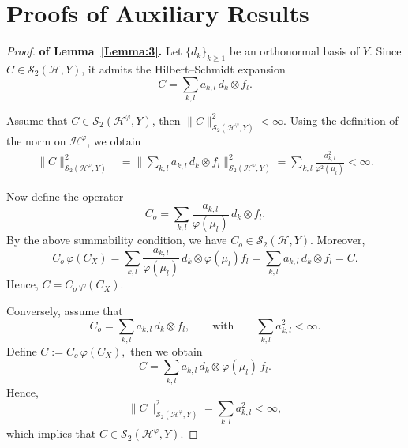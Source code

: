 \documentclass[twoside,11pt]{article}
\begin{document}
\section{Proofs of Auxiliary Results}\label{Auxillary_results}
\begin{proof}\textbf{of Lemma~\ref{Lemma:3}.}
Let $\{d_k\}_{k\ge 1}$ be an orthonormal basis of $Y$.
Since $C \in \mathcal S_2(\mathcal H,Y)$, it admits the Hilbert–Schmidt expansion
\[
C = \sum_{k,l} a_{k,l}\, d_k \otimes f_l .
\]

\noindent 
Assume that $C \in \mathcal S_2(\mathcal H^\varphi,Y)$, then
$
\|C\|_{\mathcal S_2(\mathcal H^\varphi,Y)}^2 < \infty .
$
Using the definition of the norm on $\mathcal H^\varphi$, we obtain
\begin{align*}
\|C\|_{\mathcal S_2(\mathcal H^\varphi,Y)}^2
&= \Big\| \sum_{k,l} a_{k,l}\, d_k \otimes f_l \Big\|_{\mathcal S_2(\mathcal H^\varphi,Y)}^2 = \sum_{k,l} \frac{a_{k,l}^2}{\varphi^2(\mu_l)} < \infty .
\end{align*}

\noindent
Now define the operator
\[
C_o = \sum_{k,l} \frac{a_{k,l}}{\varphi(\mu_l)} \, d_k \otimes f_l .
\]
By the above summability condition, we have $C_o \in \mathcal S_2(\mathcal H,Y)$. Moreover,
\[
C_o \, \varphi(C_X)
= \sum_{k,l} \frac{a_{k,l}}{\varphi(\mu_l)} \, d_k \otimes \varphi(\mu_l) f_l
= \sum_{k,l} a_{k,l}\, d_k \otimes f_l
= C .
\]
Hence,
$
C = C_o \, \varphi(C_X).
$

\bigskip
Conversely, assume that
\[
C_o = \sum_{k,l} a_{k,l}\, d_k \otimes f_l,
\qquad \text{with} \qquad
\sum_{k,l} a_{k,l}^2 < \infty .
\]
Define $
C := C_o \, \varphi(C_X),$ then we obtain
\[
C = \sum_{k,l} a_{k,l}\, d_k \otimes \varphi(\mu_l)\, f_l .
\]
Hence,
\[
\|C\|_{\mathcal S_2(\mathcal H^\varphi, Y)}^2
= \sum_{k,l} a_{k,l}^2
< \infty,
\]
which implies that \( C \in \mathcal S_2(\mathcal H^\varphi, Y) \).
    

\end{proof}
\end{document}
